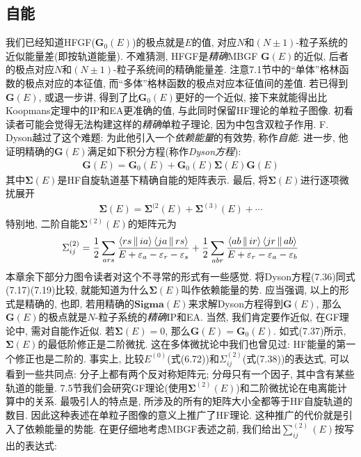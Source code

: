 \subsection{自能}
我们已经知道HFGF($\mathbf{G}_0(E)$)的极点就是$E$的值, 对应$N$和$(N\pm1)$-粒子系统的近似能量差(即按轨道能量). 不难猜测, HFGF是\emph{精确}MBGF $\mathbf{G}(E)$的近似, 后者的极点对应$N$和$(N\pm1)$-粒子系统间的精确能量差. 注意7.1节中的“单体”格林函数的极点对应\ha 的本征值, 而“多体”格林函数的极点对应本征值间的差值. 若已得到$\mathbf{G}(E)$, 或退一步讲, 得到了比$\mathbf{G}_0(E)$更好的一个近似, 接下来就能得出比Koopmans定理中的IP和EA更准确的值, 与此同时保留HF理论的单粒子图像. 初看读者可能会觉得无法构建这样的\emph{精确}单粒子理论, 因为\ha 中包含双粒子作用. F. Dyson越过了这个难题: 为此他引入一个\emph{依赖能量}的有效势, 称作\emph{自能}. 进一步, 他证明精确的$\mathbf{G}(E)$满足如下积分方程(称作\emph{Dyson方程}):
\begin{align}
\mathbf{G}(E) = \mathbf{G}_0(E) + \mathbf{G}_0(E)\mathbf{\Sigma}(E)\mathbf{G}(E) 
\end{align}
其中$\mathbf{\Sigma}(E)$是HF自旋轨道基下精确自能的矩阵表示. 最后, 将$\mathbf{\Sigma}(E)$进行逐项微扰展开
\begin{align}
\mathbf{\Sigma}(E) = \mathbf{\Sigma}^{(2}(E) + \mathbf{\Sigma}^{(3)}(E) + \cdots
\end{align}
特别地, 二阶自能$\mathbf{\Sigma}^{(2)}(E)$的矩阵元为
\begin{align}
\Sigma_{ij}^{(2)} = \frac{1}{2}\sum_{ars}\frac{\Braket{rs||ia}\Braket{ja||rs}}{E+\varepsilon_a-\varepsilon_r-\varepsilon_s} + 
\frac{1}{2}\sum_{abr}\frac{\Braket{ab||ir}\Braket{jr||ab}}{E+\varepsilon_r-\varepsilon_a-\varepsilon_b}
\end{align}
本章余下部分力图令读者对这个不寻常的形式有一些感觉. 将Dyson方程(7.36)同式(7.17)(7.19)比较, 就能知道为什么$\mathbf{\Sigma}(E)$叫作依赖能量的势. 应当强调, 以上的形式是精确的, 也即, 若用精确的$\mathbf{Sigma}(E)$来求解Dyson方程得到$\mathbf{G}(E)$, 那么$\mathbf{G}(E)$的极点就是$N$-粒子系统的\emph{精确}IP和EA. 当然, 我们肯定要作近似, 在GF理论中, 需对自能作近似. 若$\mathbf{\Sigma}(E)=0$, 那么$\mathbf{G}(E)=\mathbf{G}_0(E)$. 如式(7.37)所示, $\mathbf{\Sigma}(E)$的最低阶修正是二阶微扰. 这在多体微扰论中我们也曾见过: HF能量的第一个修正也是二阶的. 事实上, 比较$E^{(0)}$(式(6.72))和$\Sigma_{ij}^{(2)}$(式(7.38))的表达式, 可以看到一些共同点: 分子上都有两个反对称矩阵元; 分母只有一个因子, 其中含有某些轨道的能量. 7.5节我们会研究GF理论(使用$\mathbf{\Sigma}^{(2)}(E)$)和二阶微扰论在电离能计算中的关系. 最吸引人的特点是, 所涉及的所有的矩阵大小全都等于HF自旋轨道的数目. 因此这种表述在单粒子图像的意义上推广了HF理论. 这种推广的代价就是引入了依赖能量的势能. 在更仔细地考虑MBGF表述之前, 我们给出$\sum_{ij}^{(2)}(E)$按写出的表达式:
